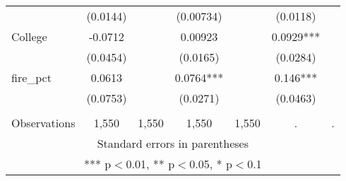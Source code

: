\begin{tabular}{lcccccc}
 & (0.0144) &  & (0.00734) &  & (0.0118) &  \\
College & -0.0712 &  & 0.00923 &  & 0.0929*** &  \\
 & (0.0454) &  & (0.0165) &  & (0.0284) &  \\
fire\_pct & 0.0613 &  & 0.0764*** &  & 0.146*** &  \\
 & (0.0753) &  & (0.0271) &  & (0.0463) &  \\
 &  &  &  &  &  &  \\
 Observations & 1,550 & 1,550 & 1,550 & 1,550 & . & . \\ \hline
\multicolumn{7}{c}{ Standard errors in parentheses} \\
\multicolumn{7}{c}{ *** p$<$0.01, ** p$<$0.05, * p$<$0.1} \\
\end{tabular}
